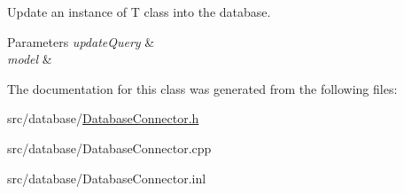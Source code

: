 Update an instance of T class into the database. 


\begin{DoxyParams}{Parameters}
{\em update\-Query} & \\
\hline
{\em model} & \\
\hline
\end{DoxyParams}


The documentation for this class was generated from the following files\-:\begin{DoxyCompactItemize}
\item 
src/database/\hyperlink{_database_connector_8h}{Database\-Connector.\-h}\item 
src/database/Database\-Connector.\-cpp\item 
src/database/Database\-Connector.\-inl\end{DoxyCompactItemize}

